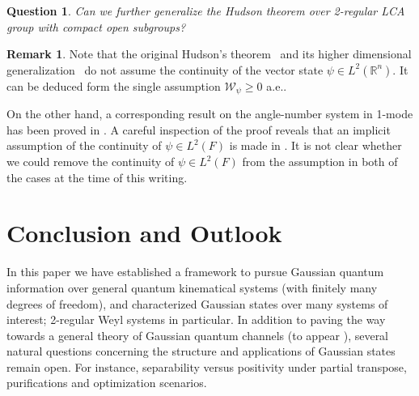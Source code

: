 \documentclass[12pt,reqno]{amsart}
\newtheorem{question}[thm]{Question}
\theoremstyle{definition}
\theoremstyle{definition}
\theoremstyle{definition}
\newtheorem{rem}[thm]{Remark}
\numberwithin{thm}{section}
\numberwithin{equation}{section}
\newcommand{\Real}{\mathbb R}
\newcommand{\W}{\mathcal{W}}
\newcommand{\tcb}[1]{\textcolor{blue}{#1}}
\begin{document}
\begin{question}
Can we further generalize the Hudson theorem over 2-regular LCA group with compact open subgroups?
\end{question}

\begin{rem}
Note that the original Hudson's theorem~\cite{hudson1974wigner} and its higher dimensional generalization~\cite{soto1983wigner} do not assume the continuity of the vector state $\psi \in L^2(\Real^n)$. It can be deduced form the single assumption $\W_\psi \ge 0$ a.e..

On the other hand, a corresponding result on the angle-number system in 1-mode has been proved in \cite{rigas2010non}. A careful inspection of the proof reveals that an implicit assumption of the continuity of $\psi \in L^2(F)$ is made in \cite{rigas2010non}. It is not clear whether we could remove the continuity of $\psi \in L^2(F)$ from the assumption in both of the cases at the time of this writing.
\end{rem}


\section{Conclusion and Outlook}

In this paper we have established a framework to pursue Gaussian quantum information over general quantum kinematical systems (with finitely many degrees of freedom), and characterized Gaussian states over many systems of interest; 2-regular Weyl systems in particular. In addition to paving the way towards a general theory of Gaussian quantum channels (to appear \cite{GQIT2}), several natural questions concerning the structure and applications of Gaussian states remain open. For instance, separability versus positivity under partial transpose, purifications and optimization scenarios.


    
    
    
\end{document}
